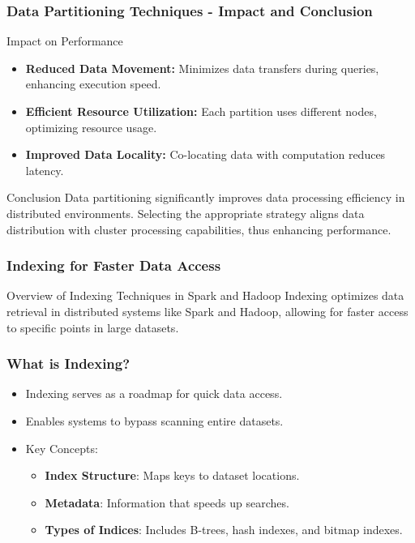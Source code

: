 \documentclass{beamer}
\begin{document}
\begin{frame}[fragile]
    \frametitle{Data Partitioning Techniques - Impact and Conclusion}
    \begin{block}{Impact on Performance}
        \begin{itemize}
            \item \textbf{Reduced Data Movement:} Minimizes data transfers during queries, enhancing execution speed.
            \item \textbf{Efficient Resource Utilization:} Each partition uses different nodes, optimizing resource usage.
            \item \textbf{Improved Data Locality:} Co-locating data with computation reduces latency.
        \end{itemize}
    \end{block}

    \begin{block}{Conclusion}
        Data partitioning significantly improves data processing efficiency in distributed environments. Selecting the appropriate strategy aligns data distribution with cluster processing capabilities, thus enhancing performance.
    \end{block}
\end{frame}

\begin{frame}[fragile]
    \frametitle{Indexing for Faster Data Access}
    \begin{block}{Overview of Indexing Techniques in Spark and Hadoop}
        Indexing optimizes data retrieval in distributed systems like Spark and Hadoop, allowing for faster access to specific points in large datasets.
    \end{block}
\end{frame}

\begin{frame}[fragile]
    \frametitle{What is Indexing?}
    \begin{itemize}
        \item Indexing serves as a roadmap for quick data access.
        \item Enables systems to bypass scanning entire datasets.
        \item Key Concepts:
        \begin{itemize}
            \item \textbf{Index Structure}: Maps keys to dataset locations.
            \item \textbf{Metadata}: Information that speeds up searches.
            \item \textbf{Types of Indices}: Includes B-trees, hash indexes, and bitmap indexes.
        \end{itemize}
    \end{itemize}
\end{frame}
\end{document}
